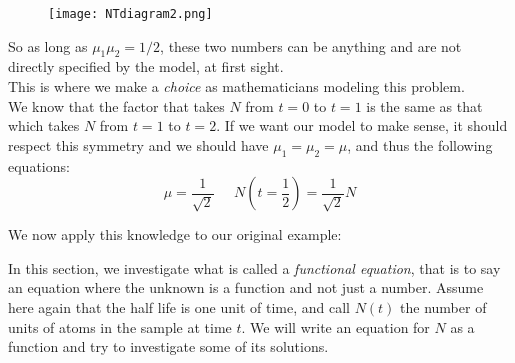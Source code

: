 \begin{figure}[H]
   \centering
   \texttt{[image: NTdiagram2.png]} 
\end{figure}

So as long as $\mu_1\mu_2=1/2$, these two numbers can be anything and are not directly specified by the model, at first sight. \\

This is where we make a \emph{choice} as mathematicians modeling this problem. \\

We know that the factor that takes $N$ from $t=0$ to $t=1$ is the same as that which takes $N$ from $t=1$ to $t=2$. If we want our model to make sense, it should respect this symmetry and we should have $\mu_1=\mu_2=\mu$, and thus the following equations: \\
\[
\mu=\frac{1}{\sqrt{2}} \;\;\;\;\; N\left(t=\frac{1}{2}\right)= \frac{1}{\sqrt{2}} N
\]

We now apply this knowledge to our original example: \\

 \vspace{0.2cm}


In this section, we investigate what is called a \emph{functional equation}, that is to say an equation where the unknown is a function and not just a number. Assume here again that the half life is one unit of time, and call $N(t)$ the number of units of atoms in the sample at time $t$. We will write an equation for $N$ as a function and try to investigate some of its solutions.

